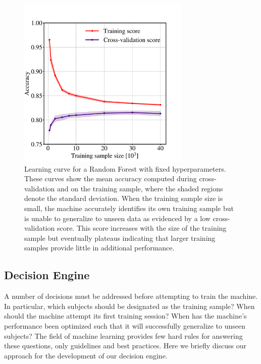 \documentclass[twocolumn,  trackchanges, ]{aastex6}%
\begin{document}
\begin{figure}[t!]
\includegraphics[width=3.25in]{f9.pdf}
\caption{Learning curve for a Random Forest with fixed hyperparameters. These curves show the mean accuracy computed during cross-validation and on the training sample, where the shaded regions denote the standard deviation. When the training sample size is small, the machine accurately identifies its own training sample but is unable to generalize to unseen data as evidenced by a low cross-validation score. This score increases with the size of the training sample but eventually plateaus indicating that larger training samples provide little in additional performance. \label{fig: learning curve}}
\end{figure}


\subsection{Decision Engine}\label{sec: decision engine}
A number of decisions must be addressed before attempting to train the machine. 
In particular, which subjects should be designated as the training sample? 
When should the machine attempt its first training session? 
When has the machine's performance been optimized such that it will successfully
generalize to unseen subjects? The field of machine learning provides few hard rules 
for answering these questions, only guidelines and best practices. 
Here we briefly discuss our approach for the development of our decision engine.
\end{document}
